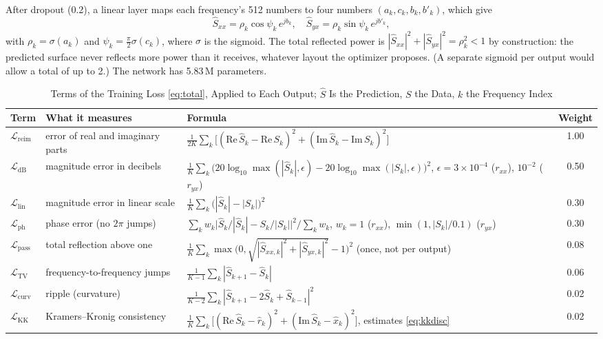 \documentclass[journal]{IEEEtran}
\newcommand{\Sc}{\hat{S}}
\newcommand{\Lloss}[1]{\mathcal{L}_{\mathrm{#1}}}
\begin{document}
After dropout (0.2), a linear layer maps each frequency's 512 numbers to four numbers $(a_k,c_k,b_k,b'_k)$, which give
\begin{equation}
\Sc_{xx}=\rho_k\cos\psi_k\,e^{jb_k},\quad \Sc_{yx}=\rho_k\sin\psi_k\,e^{jb'_k},
\label{eq:polar}
\end{equation}
with $\rho_k=\sigma(a_k)$ and $\psi_k=\tfrac{\pi}{2}\sigma(c_k)$, where $\sigma$ is the sigmoid. The total reflected power is $|\Sc_{xx}|^2+|\Sc_{yx}|^2=\rho_k^2<1$ by construction: the predicted surface never reflects more power than it receives, whatever layout the optimizer proposes. (A separate sigmoid per output would allow a total of up to 2.) The network has 5.83\,M parameters.

\begin{table}[!t]
\caption{Terms of the Training Loss \eqref{eq:total}, Applied to Each Output; $\Sc$ Is the Prediction, $S$ the Data, $k$ the Frequency Index}
\label{tab:loss}
\centering
\footnotesize
\renewcommand{\arraystretch}{1.25}
\begin{tabular}{@{}lllc@{}}
\toprule
Term & What it measures & Formula & Weight \\
\midrule
$\Lloss{reim}$ & error of real and imaginary parts & $\frac{1}{2K}\sum_k\big[(\mathrm{Re}\,\Sc_k-\mathrm{Re}\,S_k)^2+(\mathrm{Im}\,\Sc_k-\mathrm{Im}\,S_k)^2\big]$ & 1.00 \\
$\Lloss{dB}$ & magnitude error in decibels & $\frac{1}{K}\sum_k\big(20\log_{10}\max(|\Sc_k|,\epsilon)-20\log_{10}\max(|S_k|,\epsilon)\big)^2$, $\epsilon=3\times10^{-4}$ ($r_{xx}$), $10^{-2}$ ($r_{yx}$) & 0.50 \\
$\Lloss{lin}$ & magnitude error in linear scale & $\frac{1}{K}\sum_k\big(|\Sc_k|-|S_k|\big)^2$ & 0.30 \\
$\Lloss{ph}$ & phase error (no $2\pi$ jumps) & $\sum_k w_k\big|\Sc_k/|\Sc_k|-S_k/|S_k|\big|^2/\sum_k w_k$, $w_k=1$ ($r_{xx}$), $\min(1,|S_k|/0.1)$ ($r_{yx}$) & 0.30 \\
$\Lloss{pass}$ & total reflection above one & $\frac{1}{K}\sum_k \max\big(0,\sqrt{|\Sc_{xx,k}|^2+|\Sc_{yx,k}|^2}-1\big)^2$ (once, not per output) & 0.08 \\
$\Lloss{TV}$ & frequency-to-frequency jumps & $\frac{1}{K-1}\sum_k |\Sc_{k+1}-\Sc_k|$ & 0.06 \\
$\Lloss{curv}$ & ripple (curvature) & $\frac{1}{K-2}\sum_k |\Sc_{k+1}-2\Sc_k+\Sc_{k-1}|^2$ & 0.02 \\
$\Lloss{KK}$ & Kramers--Kronig consistency & $\frac{1}{K}\sum_k\big[(\mathrm{Re}\,\Sc_k-\hat r_k)^2+(\mathrm{Im}\,\Sc_k-\hat x_k)^2\big]$, estimates \eqref{eq:kkdisc} & 0.02 \\
\bottomrule
\end{tabular}
\end{table}
\end{document}
